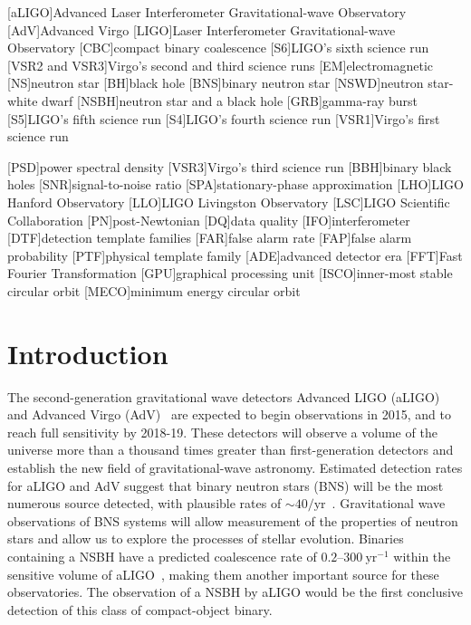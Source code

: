 \def\Msun{M_\odot}
[aLIGO]{Advanced Laser Interferometer Gravitational-wave Observatory}
[AdV]{Advanced Virgo}
[LIGO]{Laser Interferometer Gravitational-wave Observatory}
[CBC]{compact binary coalescence}
[S6]{LIGO's sixth science run}
[VSR2 and VSR3]{Virgo's second and third science runs}
[EM]{electromagnetic}
[NS]{neutron star}
[BH]{black hole}
[BNS]{binary neutron star}
[NSWD]{neutron star-white dwarf}
[NSBH]{neutron star and a black hole}
[GRB]{gamma-ray burst}
[S5]{LIGO's fifth science run}
[S4]{LIGO's fourth science run}
[VSR1]{Virgo's first science run}

[PSD]{power spectral density}
[VSR3]{Virgo's third science run}
[BBH]{binary black holes}
[SNR]{signal-to-noise ratio}
[SPA]{stationary-phase approximation}
[LHO]{LIGO Hanford Observatory}
[LLO]{LIGO Livingston Observatory}
[LSC]{LIGO Scientific Collaboration}
[PN]{post-Newtonian}
[DQ]{data quality}
[IFO]{interferometer}
[DTF]{detection template families}
[FAR]{false alarm rate}
[FAP]{false alarm probability}
[PTF]{physical template family}
[ADE]{advanced detector era}
[FFT]{Fast Fourier Transformation}
[GPU]{graphical processing unit}
[ISCO]{inner-most stable circular orbit}
[MECO]{minimum energy circular orbit}


\section{Introduction}

The second-generation gravitational wave detectors Advanced LIGO (aLIGO) and
Advanced Virgo (AdV)~\cite{Harry:2010zz, aVirgo} are expected to begin
observations in 2015, and to reach full sensitivity by 2018-19. These detectors
will observe a volume of the universe more than a thousand times greater than
first-generation detectors and establish the new field of gravitational-wave
astronomy. Estimated detection rates for aLIGO and AdV suggest that binary
neutron stars (BNS) will be the most numerous source detected, with plausible
rates of $\sim 40/\mathrm{yr}$~\cite{Abadie:2010cf}.
Gravitational wave
observations of BNS systems will allow measurement of the properties of
neutron stars and allow us to explore the processes of stellar evolution. 
Binaries containing a \ac{NSBH} have a predicted 
coalescence rate of $0.2$--$300\ \textrm{yr}^{-1}$ within the sensitive volume
of aLIGO~\cite{Abadie:2010cf}, making them another important source for these
observatories. The observation of a \ac{NSBH} by \ac{aLIGO} would be the first 
conclusive detection of this class of compact-object binary.

